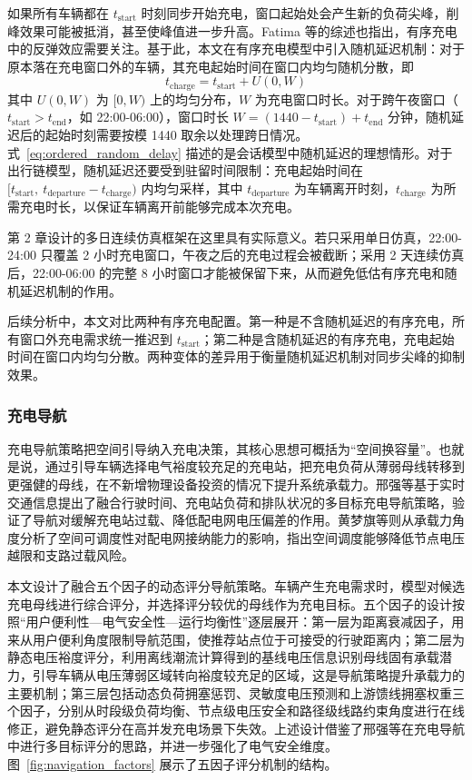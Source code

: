 \documentclass[10pt,a4paper]{article}
\numberwithin{equation}{section}
\numberwithin{table}{section}
\numberwithin{figure}{section}
\begin{document}
    如果所有车辆都在 $t_{\text{start}}$ 时刻同步开始充电，窗口起始处会产生新的负荷尖峰，削峰效果可能被抵消，甚至使峰值进一步升高。Fatima 等\supercite{ref6}的综述也指出，有序充电中的反弹效应需要关注。基于此，本文在有序充电模型中引入随机延迟机制：对于原本落在充电窗口外的车辆，其充电起始时间在窗口内均匀随机分散，即
    \begin{equation}
        \label{eq:ordered_random_delay}
        t_{\text{charge}} = t_{\text{start}} + U(0, W)
    \end{equation}
    其中 $U(0, W)$ 为 $[0, W)$ 上的均匀分布，$W$ 为充电窗口时长。对于跨午夜窗口（$t_{\text{start}} > t_{\text{end}}$，如 22:00-06:00），窗口时长 $W = (1440 - t_{\text{start}}) + t_{\text{end}}$ 分钟，随机延迟后的起始时刻需要按模 1440 取余以处理跨日情况。式~\eqref{eq:ordered_random_delay} 描述的是会话模型中随机延迟的理想情形。对于出行链模型，随机延迟还要受到驻留时间限制：充电起始时间在 $[t_{\text{start}},\ t_{\text{departure}} - t_{\text{charge}})$ 内均匀采样，其中 $t_{\text{departure}}$ 为车辆离开时刻，$t_{\text{charge}}$ 为所需充电时长，以保证车辆离开前能够完成本次充电。

    第 2 章设计的多日连续仿真框架在这里具有实际意义。若只采用单日仿真，22:00-24:00 只覆盖 2 小时充电窗口，午夜之后的充电过程会被截断；采用 2 天连续仿真后，22:00-06:00 的完整 8 小时窗口才能被保留下来，从而避免低估有序充电和随机延迟机制的作用。

    后续分析中，本文对比两种有序充电配置。第一种是不含随机延迟的有序充电，所有窗口外充电需求统一推迟到 $t_{\text{start}}$；第二种是含随机延迟的有序充电，充电起始时间在窗口内均匀分散。两种变体的差异用于衡量随机延迟机制对同步尖峰的抑制效果。

    \subsubsection{充电导航}

    充电导航策略把空间引导纳入充电决策，其核心思想可概括为“空间换容量”\supercite{ref17}。也就是说，通过引导车辆选择电气裕度较充足的充电站，把充电负荷从薄弱母线转移到更强健的母线，在不新增物理设备投资的情况下提升系统承载力。邢强等\supercite{ref21}基于实时交通信息提出了融合行驶时间、充电站负荷和排队状况的多目标充电导航策略，验证了导航对缓解充电站过载、降低配电网电压偏差的作用。黄梦旗等\supercite{ref17}则从承载力角度分析了空间可调度性对配电网接纳能力的影响，指出空间调度能够降低节点电压越限和支路过载风险。

    本文设计了融合五个因子的动态评分导航策略。车辆产生充电需求时，模型对候选充电母线进行综合评分，并选择评分较优的母线作为充电目标。五个因子的设计按照“用户便利性—电气安全性—运行均衡性”逐层展开：第一层为距离衰减因子，用来从用户便利角度限制导航范围，使推荐站点位于可接受的行驶距离内；第二层为静态电压裕度评分，利用离线潮流计算得到的基线电压信息识别母线固有承载潜力，引导车辆从电压薄弱区域转向裕度较充足的区域，这是导航策略提升承载力的主要机制；第三层包括动态负荷拥塞惩罚、灵敏度电压预测和上游馈线拥塞权重三个因子，分别从时段级负荷均衡、节点级电压安全和路径级线路约束角度进行在线修正，避免静态评分在高并发充电场景下失效。上述设计借鉴了邢强等\supercite{ref21}在充电导航中进行多目标评分的思路，并进一步强化了电气安全维度。图~\ref{fig:navigation_factors} 展示了五因子评分机制的结构。
\end{document}

